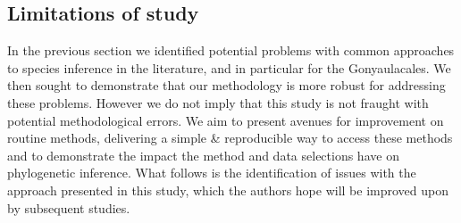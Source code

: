 \documentclass[12pt]{article}
\begin{document}

\subsection*{Limitations of study}
In the previous section we identified potential problems with common approaches to species inference in the literature, and in particular for the Gonyaulacales. 
We then sought to demonstrate that our methodology is more robust for addressing these problems. 
However we do not imply that this study is not fraught with potential methodological errors. 
We aim to present avenues for improvement on routine methods, delivering a simple \& reproducible way to access these methods and to demonstrate the impact the method and data selections have on phylogenetic inference. %
What follows is the identification of issues with the approach presented in this study, which the authors hope will be improved upon by subsequent studies. 
\end{document}
